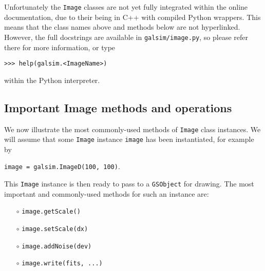 \documentclass[preprint,11pt]{aastex}
\begin{document}
Unfortunately the \texttt{Image} classes are not yet fully integrated
within the online documentation, due to their being in C++ with
compiled Python wrappers.  This means that the class names above and
methods below are not hyperlinked.  However, the full docstrings are
available in \texttt{galsim/image.py}, so please refer there for more
information, or type

{\tt >>> help(galsim.<ImageName>)}

within the Python interpreter.

\subsection{Important Image methods and operations}\label{sect:imagemethods}
We now illustrate the most commonly-used methods of \texttt{Image}
class instances.  We will assume that some \texttt{Image} instance
\texttt{image} has been instantiated, for example by

{\tt image = galsim.ImageD(100, 100)}.

This \texttt{Image} instance is then ready to pass to a
\texttt{GSObject} for drawing.  The most important and commonly-used
methods for such an instance are:
\begin{itemize}

\item[$\circ$] \texttt{image.getScale()} 

\item[$\circ$] \texttt{image.setScale(dx)} 

\item[$\circ$] \texttt{image.addNoise(dev)} 

\item[$\circ$] \texttt{image.write(fits, ...)}  

\end{itemize}
\end{document}

